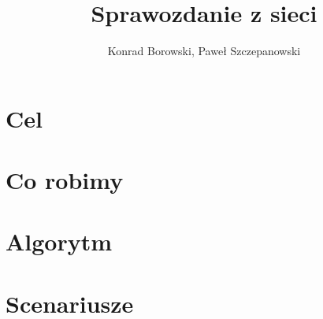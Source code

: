 \documentclass[a4paper,11pt]{article}
\title{Sprawozdanie z sieci}
\author{Konrad Borowski, Paweł Szczepanowski}
\begin{document}

\maketitle

\section{Cel}

\section{Co robimy}

\section{Algorytm}

\section{Scenariusze}
\end{document}
